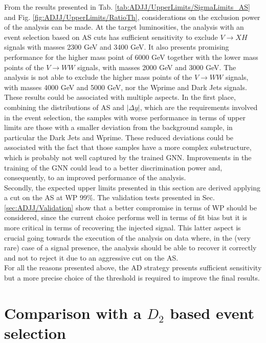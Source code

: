 \noindent From the results presented in Tab. \ref{tab:ADJJ/UpperLimits/SigmaLimits_AS} and Fig. \ref{fig:ADJJ/UpperLimits/RatioTh}, considerations on the exclusion power of the analysis can be made.
At the target luminosities, the analysis with an event selection based on AS cuts has sufficient sensitivity to exclude  $V \to XH$ signals with masses 2300 GeV and 3400 GeV.
It also presents promising performance for the higher mass point of 6000 GeV together with the lower mass points of the $V \to WW$ signals, with masses 2000 GeV and 3000 GeV.
The analysis is not able to exclude the higher mass points of the $V \to WW$ signals, with masses 4000 GeV and 5000 GeV, nor the Wprime and Dark Jets signals.\\
These results could be associated with multiple aspects.
In the first place, combining the distributions of AS and $|\Delta y|$, which are the requirements involved in the event selection, the samples with worse performance in terms of upper limits are those with a smaller deviation from the background sample, in particular the Dark Jets and Wprime.
These reduced deviations could be associated with the fact that those samples have a more complex substructure, which is probably not well captured by the trained GNN.
Improvements in the training of the GNN could lead to a better discrimination power and, consequently, to an improved performance of the analysis.\\
Secondly, the expected upper limits presented in this section are derived applying a cut on the AS at WP 99\%.
The validation tests presented in Sec. \ref{sec:ADJJ/Validation} show that a better compromise in terms of WP should be considered, since the current choice performs well in terms of fit bias but it is more critical in terms of recovering the injected signal.
This latter aspect is crucial going towards the execution of the analysis on data where, in the (very rare) case of a signal presence, the analysis should be able to recover it correctly and not to reject it due to an aggressive cut on the AS.\\
For all the reasons presented above, the AD strategy presents sufficient sensitivity but a more precise choice of the threshold is required to improve the final results.


\section{Comparison with a $D_2$ based event selection}\label{sec:ADJJ/D2}


